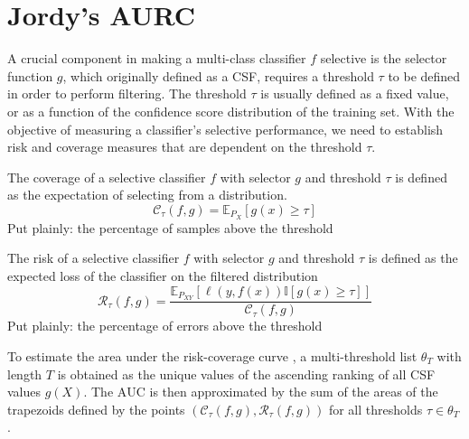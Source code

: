 \section*{Jordy's AURC}

A crucial component in making a multi-class classifier $f$ selective is the selector function $g$, which originally defined as a CSF, requires a threshold $\tau$ to be defined in order to perform filtering. The threshold $\tau$ is usually defined as a fixed value, or as a function of the confidence score distribution of the training set.
With the objective of measuring a classifier's selective performance, we need to establish risk and coverage measures that are dependent on the threshold $\tau$.

\begin{definition}[Coverage]
    The coverage of a selective classifier $f$ with selector $g$ and threshold $\tau$ is defined as the expectation of selecting from a distribution.
    \begin{equation}
        \mathcal{C}_{\tau}(f, g)=\mathbb{E}_{P_X}\left[g(x) \geq \tau\right]
    \end{equation}
    Put plainly: the percentage of samples above the threshold %
\end{definition}

\begin{definition}[Risk]
    The risk of a selective classifier $f$ with selector $g$ and threshold $\tau$ is defined as the expected loss of the classifier on the filtered distribution
    \begin{equation}
        \mathcal{R}_{\tau}(f, g)=\frac{\mathbb{E}_{P_{XY}}\left[\ell\left(y, f(x)\right) \mathbb{I}\left[g(x) \geq \tau\right]  \right]}{\mathcal{C}_{\tau}(f, g)} %
    \end{equation}
    Put plainly: the percentage of errors above the threshold %
\end{definition}

To estimate the area under the risk-coverage curve \AURC{}, a multi-threshold list $\theta_T$ with length $T$ is obtained as the unique values of the ascending ranking of all CSF values $g(X)$. The $\mathrm{AUC}$ is then approximated by the sum of the areas of the trapezoids defined by the points $(\mathcal{C}_{\tau}(f, g), \mathcal{R}_{\tau}(f, g))$ for all thresholds $\tau \in \theta_T$.

